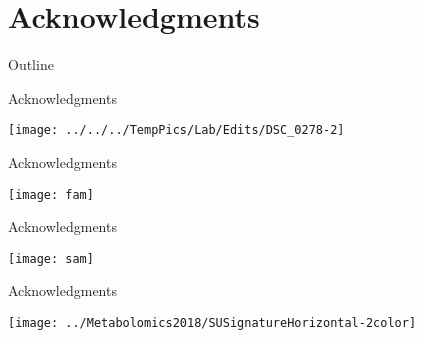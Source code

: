 \documentclass[xcolor=dvipsnames]{beamer}
\begin{document}
\section{Acknowledgments}
\begin{frame}{Outline}
	\vspace{-10.5pt}
	\tableofcontents[currentsection,subsectionstyle=hide]
\end{frame}

\begin{frame}{Acknowledgments}
	\vspace{-5.5pt}
	\begin{center}
		\texttt{[image: ../../../TempPics/Lab/Edits/DSC\_0278-2]}
	\end{center}
\end{frame}

\begin{frame}{Acknowledgments}
	\vspace{-5.5pt}
	\begin{center}
		\texttt{[image: fam]}
	\end{center}
\end{frame}

\begin{frame}{Acknowledgments}
	\vspace{-5.5pt}
	\begin{center}
		\texttt{[image: sam]}
	\end{center}
\end{frame}

\begin{frame}{Acknowledgments}
	\vspace{-15.5pt}
	\begin{center}
		\texttt{[image: ../Metabolomics2018/SUSignatureHorizontal-2color]}
	\end{center}
\end{frame}
\end{document}

